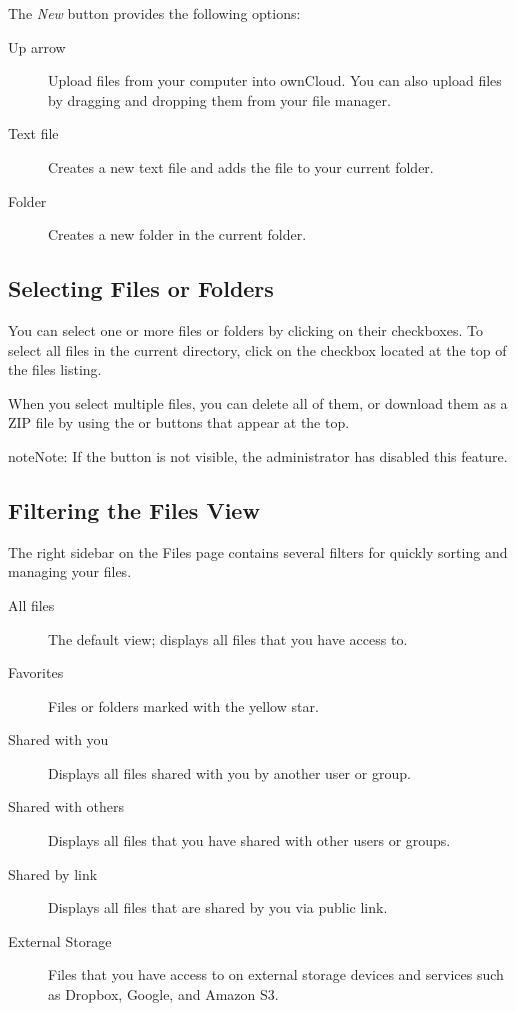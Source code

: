 \documentclass[letterpaper,10pt,english]{sphinxmanual}
\begin{document}
The \emph{New} button provides the following options:
\begin{description}
\item[{Up arrow}] \leavevmode
Upload files from your computer into ownCloud. You can also upload files by
dragging and dropping them from your file manager.

\item[{Text file}] \leavevmode
Creates a new text file and adds the file to your current folder.

\item[{Folder}] \leavevmode
Creates a new folder in the current folder.

\end{description}


\subsection{Selecting Files or Folders}
\label{files/access_webgui:selecting-files-or-folders}
You can select one or more files or folders by clicking on their checkboxes.  To
select all files in the current directory, click on the checkbox located at the
top of the files listing.

When you select multiple files, you can delete all of them, or download them as
a ZIP file by using the  or  buttons that appear at the
top.

\begin{notice}{note}{Note:}
If the  button is not visible, the administrator has
disabled this feature.
\end{notice}


\subsection{Filtering the Files View}
\label{files/access_webgui:filtering-the-files-view}
The right sidebar on the Files page contains several filters for quickly sorting
and managing your files.
\begin{description}
\item[{All files}] \leavevmode
The default view; displays all files that you have access to.

\item[{Favorites}] \leavevmode
Files or folders marked with the yellow star.

\item[{Shared with you}] \leavevmode
Displays all files shared with you by another user or group.

\item[{Shared with others}] \leavevmode
Displays all files that you have shared with other users or groups.

\item[{Shared by link}] \leavevmode
Displays all files that are shared by you via public link.

\item[{External Storage}] \leavevmode
Files that you have access to on external storage devices and services such
as Dropbox, Google, and Amazon S3.

\end{description}
\end{document}

